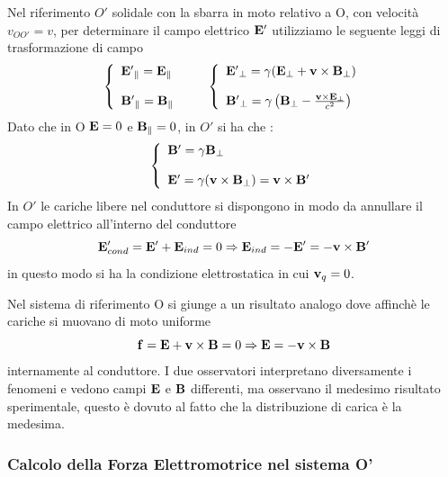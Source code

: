 Nel riferimento $O'$ solidale con la sbarra in moto relativo a O, con velocit\`a $v_{OO'} = v$, per determinare il campo elettrico $\bold{E'}$ utilizziamo le seguente leggi di trasformazione di campo
\begin{align}
\left \{ \begin{array}{l}
	\bold{E'}_{\parallel} = \bold{E}_{\parallel} \\ \rule{0pt}{20pt}
	\bold{B'}_{\parallel} = \bold{B}_{\parallel}
\end{array}	\right.
\quad \quad
\left \{ \begin{array}{l}
	\bold{E'}_{\perp} = \gamma (\bold{E}_{\perp} + \bold{v} \times \bold{B}_{\perp}) \\ \rule{0pt}{20pt}
	\bold{B'}_{\perp} = \gamma \left(\bold{B}_{\perp} - \frac{\bold{v} \times \bold{E}_{\perp}}{c^2} \right)
\end{array}	\right. 
\end{align}
Dato che in O $\bold{E} = 0$ e $\bold{B}_{\parallel} = 0$, in $O'$ si ha che :
\begin{align}
	\left \{ \begin{array}{l}
		\bold{B}' = \gamma \bold{B}_{\perp} \\ \rule {0pt}{20pt}
		\bold{E}' = \gamma (\bold{v} \times \bold{B}_{\perp}) = \bold{v} \times \bold{B}' 
	\end{array}\right.
\end{align}
In $O'$ le cariche libere nel conduttore si dispongono in modo da annullare il campo elettrico all'interno del conduttore 
\begin{equation*}
	\bold{E}'_{cond} = \bold{E}' + \bold{E}_{ind} = 0 \Rightarrow  \bold{E}_{ind} = -\bold{E}' =-\bold{v} \times \bold{B}'
\end{equation*}
in questo modo si ha la condizione elettrostatica in cui $\bold{v}_q = 0$.

Nel sistema di riferimento O si giunge a un risultato analogo dove affinch\`e le cariche si muovano di moto uniforme 
\begin{equation*}
	\bold{f} = \bold{E} + \bold{v} \times \bold{B} = 0 \Rightarrow \bold{E} = -\bold{v} \times \bold{B}
\end{equation*}
internamente al conduttore.
I due osservatori interpretano diversamente i fenomeni e vedono campi $\bold{E}$ e $\bold{B}$ differenti, ma osservano il medesimo risultato sperimentale, questo \`e dovuto al fatto che la distribuzione di carica \`e la medesima.

\subsubsection{Calcolo della Forza Elettromotrice nel sistema O'}


